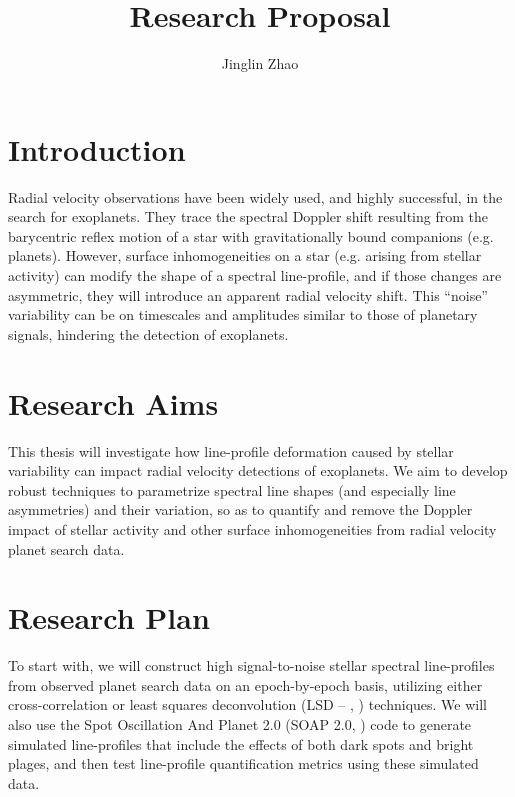 \documentclass[a4paper]{article}
\title{Research Proposal}
\author{Jinglin Zhao}
\begin{document}
\maketitle

\section{Introduction}

Radial velocity observations have been widely used, and highly successful, in the search for exoplanets. They trace the spectral Doppler shift resulting from the barycentric reflex motion of a star with gravitationally bound companions (e.g. planets). However, surface inhomogeneities on a star (e.g. arising from stellar activity) can modify the shape of a spectral line-profile, and if those changes are asymmetric, they will introduce an apparent radial velocity shift. This ``noise'' variability can be on timescales and amplitudes similar to those of planetary signals, hindering the detection of exoplanets. 

\section{Research Aims}

This thesis will investigate how line-profile deformation caused by stellar variability can impact radial velocity detections of exoplanets. We aim to develop robust techniques to parametrize spectral line shapes (and especially line asymmetries) and their variation, so as to quantify and remove the Doppler impact of stellar activity and other surface inhomogeneities from radial velocity planet search data. 



\section{Research Plan}

To start with, we will construct high signal-to-noise stellar spectral line-profiles from observed planet search data on an epoch-by-epoch basis, utilizing either cross-correlation or least squares deconvolution (LSD -- \cite{Donati1997}, \cite{Kochukhov2010}) techniques. We will also use the Spot Oscillation And Planet 2.0 (SOAP 2.0, \cite{Dumusque2014SOAP}) code to generate simulated line-profiles that include the effects of both dark spots and bright plages, and then test line-profile quantification metrics using these simulated data.
\end{document}
